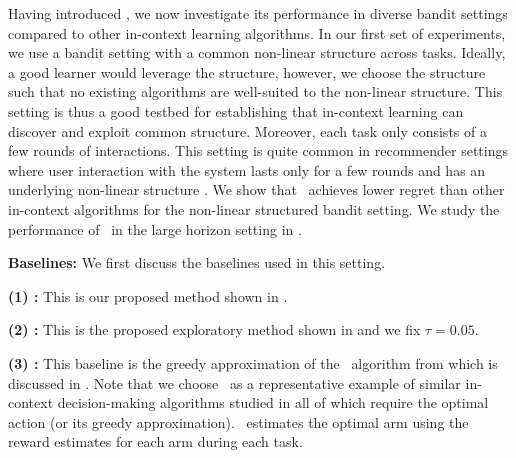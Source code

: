 Having introduced \pred, we now investigate its performance in diverse bandit settings compared to other in-context learning algorithms.
% 
In our first set of experiments, we use a bandit setting with a common non-linear structure across tasks.
Ideally, a good learner would leverage the structure, however, we choose the structure such that no existing algorithms are well-suited to the non-linear structure.
% 
This setting is thus a good testbed for establishing that in-context learning can discover and exploit common structure.
%
Moreover, each task only consists of a few rounds of interactions.
%
This setting is quite common in recommender settings where user interaction with the system lasts only for a few rounds and has an underlying non-linear structure \citep{kwon2022tractable, tomkins2020rapidly}.
%
We show that \pred\ achieves lower regret than other in-context algorithms for the non-linear structured bandit setting. 
%
%
We study the performance of \pred\ in the large horizon setting in . 


\textbf{Baselines:} We first discuss the baselines used in this setting.

\noindent
\textbf{(1) \pred:} This is our proposed method shown in .

\textbf{(2) \predt:} This is the proposed exploratory method shown in  and we fix $\tau=0.05$. 

\textbf{(3) \dptg:} This baseline is the greedy approximation of the \dpt\ algorithm from \citet{lee2023supervised} which is discussed in .
%
Note that we choose \dptg\ as a representative example of similar in-context decision-making algorithms studied in \citet{lee2023supervised, sinii2023context, lin2023transformers, ma2023rethinking, liu2023reason, liu2023self} all of which require the optimal action (or its greedy approximation). 
%
\dptg\ estimates the optimal arm using the reward estimates for each arm during each task. %
%
 
